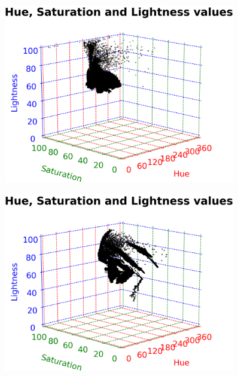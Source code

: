 \vspace{1mm}

\begin{figure}[H]
	\centering
	\begin{minipage}{0.5\textwidth}
		\centering
		\includegraphics[width=0.9\textwidth]{img/hsl3DBlue.png}
		\captionsetup{width=0.9\textwidth}
		\label{hsl3DBluePlot}
	\end{minipage}%
	\begin{minipage}{0.5\textwidth}
		\centering
		\includegraphics[width=0.9\textwidth]{img/hsl3DPink.png}
		\captionsetup{width=0.9\textwidth}
		\label{hsl3DPinkPlot}
	\end{minipage}
\end{figure}

